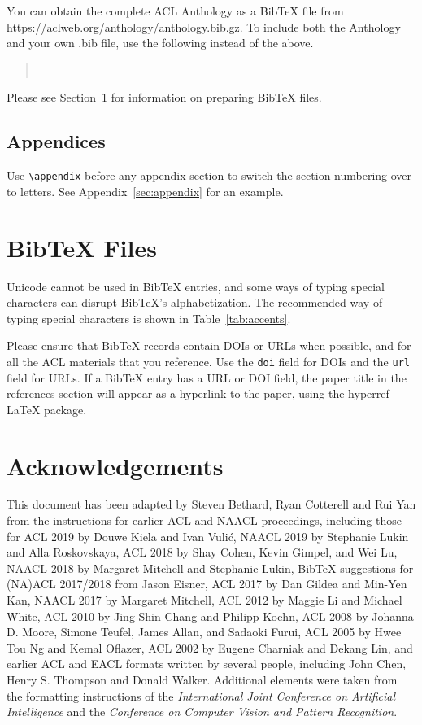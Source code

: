 \documentclass[11pt]{article}
\begin{document}
You can obtain the complete ACL Anthology as a Bib\TeX{} file from \url{https://aclweb.org/anthology/anthology.bib.gz}.
To include both the Anthology and your own .bib file, use the following instead of the above.
\begin{quote}
\begin{verbatim}


\end{verbatim}
\end{quote}

Please see Section~\ref{sec:bibtex} for information on preparing Bib\TeX{} files.

\subsection{Appendices}

Use \verb|\appendix| before any appendix section to switch the section numbering over to letters. See Appendix~\ref{sec:appendix} for an example.

\section{Bib\TeX{} Files}
\label{sec:bibtex}

Unicode cannot be used in Bib\TeX{} entries, and some ways of typing special characters can disrupt Bib\TeX's alphabetization. The recommended way of typing special characters is shown in Table~\ref{tab:accents}.

Please ensure that Bib\TeX{} records contain DOIs or URLs when possible, and for all the ACL materials that you reference.
Use the \verb|doi| field for DOIs and the \verb|url| field for URLs.
If a Bib\TeX{} entry has a URL or DOI field, the paper title in the references section will appear as a hyperlink to the paper, using the hyperref \LaTeX{} package.

\section*{Acknowledgements}

This document has been adapted
by Steven Bethard, Ryan Cotterell and Rui Yan
from the instructions for earlier ACL and NAACL proceedings, including those for 
ACL 2019 by Douwe Kiela and Ivan Vuli\'{c},
NAACL 2019 by Stephanie Lukin and Alla Roskovskaya, 
ACL 2018 by Shay Cohen, Kevin Gimpel, and Wei Lu, 
NAACL 2018 by Margaret Mitchell and Stephanie Lukin,
Bib\TeX{} suggestions for (NA)ACL 2017/2018 from Jason Eisner,
ACL 2017 by Dan Gildea and Min-Yen Kan, 
NAACL 2017 by Margaret Mitchell, 
ACL 2012 by Maggie Li and Michael White, 
ACL 2010 by Jing-Shin Chang and Philipp Koehn, 
ACL 2008 by Johanna D. Moore, Simone Teufel, James Allan, and Sadaoki Furui, 
ACL 2005 by Hwee Tou Ng and Kemal Oflazer, 
ACL 2002 by Eugene Charniak and Dekang Lin, 
and earlier ACL and EACL formats written by several people, including
John Chen, Henry S. Thompson and Donald Walker.
Additional elements were taken from the formatting instructions of the \emph{International Joint Conference on Artificial Intelligence} and the \emph{Conference on Computer Vision and Pattern Recognition}.
\end{document}
